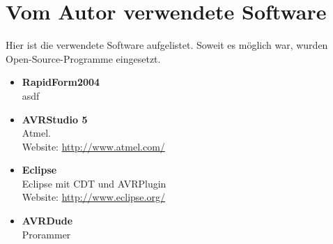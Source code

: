 \section{Vom Autor verwendete Software}
\label{sec:Werkzeuge}
Hier ist die verwendete Software aufgelistet. Soweit es möglich war, wurden Open-Source-Programme eingesetzt.
\begin{itemize}
\item \textbf{RapidForm2004} \\
asdf
\item \textbf{AVRStudio 5} \\
Atmel. \\
Website: \url{http://www.atmel.com/}  
\item \textbf{Eclipse} \\
Eclipse mit CDT und AVRPlugin
\\
Website: \url{http://www.eclipse.org/}  
\item \textbf{AVRDude} \\
Prorammer \\
\end{itemize}
